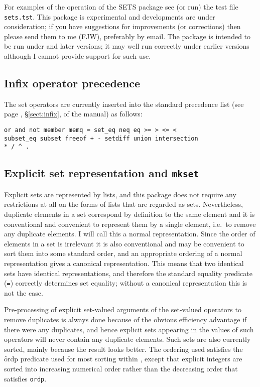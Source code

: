 For examples of the operation of the SETS package see (or run) the
test file \texttt{sets.tst}.  This package is experimental and
developments are under consideration; if you have suggestions for
improvements (or corrections) then please send them to me (FJW),
preferably by email.  The package is intended to be run under
 and later versions; it may well run correctly under earlier
versions although I cannot provide support for such use.


\subsection{Infix operator precedence}

The set operators are currently inserted into the standard \REDUCE
precedence list (see page \pageref{sect:infix}, \S\ref{sect:infix}, of the \REDUCE manual) as
follows:
\begin{verbatim}
or and not member memq = set_eq neq eq >= > <= <
subset_eq subset freeof + - setdiff union intersection
* / ^ .
\end{verbatim}


\subsection{Explicit set representation and \texttt{mkset}}
\hypertarget{operator:SETS_MKSET}{}

Explicit sets are represented by lists, and this package does not
require any restrictions at all on the forms of lists that are
regarded as sets.  Nevertheless, duplicate elements in a set
correspond by definition to the same element and it is conventional
and convenient to represent them by a single element, i.e.\ to remove
any duplicate elements.  I will call this a normal representation.
Since the order of elements in a set is irrelevant it is also
conventional and may be convenient to sort them into some standard
order, and an appropriate ordering of a normal representation gives a
canonical representation.  This means that two identical sets have
identical representations, and therefore the standard \REDUCE equality
predicate (\texttt{=}) 
correctly determines set equality; without a
canonical representation this is not the case.

Pre-processing of explicit set-valued arguments of the set-valued
operators to remove duplicates is always done because of the obvious
efficiency advantage if there were any duplicates, and hence explicit
sets appearing in the values of such operators will never contain any
duplicate elements.  Such sets are also currently sorted, mainly
because the result looks better.  The ordering used satisfies the \f{ordp}
predicate used for most sorting within \REDUCE, except that
explicit integers are sorted into increasing numerical order rather
than the decreasing order that satisfies \texttt{ordp}.

